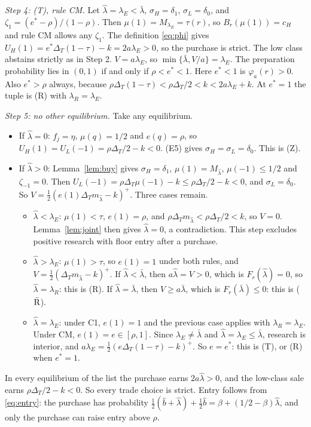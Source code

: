 \documentclass[12pt]{article}
\theoremstyle{definition}
\theoremstyle{remark}
\newcommand{\DT}{\Delta_T}
\newcommand{\lh}{\hat\lambda}
\newcommand{\lb}{\bar\lambda}
\begin{document}
\emph{Step 4: (T), rule CM.} Let $\lh=\lambda_E<\lb$, $\sigma_H=\delta_1$, $\sigma_L=\delta_0$, and
$\zeta_1=(e^*-\rho)/(1-\rho)$. Then $\mu(1)=M_{\lambda_E}=\tau(r)$, so $B_r(\mu(1))=c_H$ and rule CM allows any
$\zeta_1$. The definition \eqref{eq:phi} gives $U_H(1)=e^*\DT(1-\tau)-k=2a\lambda_E>0$, so the purchase is strict.
The low class abstains strictly as in Step 2. $V=a\lambda_E$, so $\min\{\lb,V/a\}=\lambda_E$. The preparation
probability lies in $(0,1)$ if and only if $\rho<e^*<1$. Here $e^*<1$ is $\varphi_a(r)>0$. Also
$e^*>\rho$ always, because $\rho\DT(1-\tau)<\rho\DT/2<k<2a\lambda_E+k$. At $e^*=1$ the tuple is (R) with
$\lambda_R=\lambda_E$.

\emph{Step 5: no other equilibrium.} Take any equilibrium.
\begin{itemize}[nosep]
\item If $\lh=0$: $f_j=\eta$, $\mu(q)=1/2$ and $e(q)=\rho$, so $U_H(1)=U_L(-1)=\rho\DT/2-k<0$. (E5) gives
  $\sigma_H=\sigma_L=\delta_0$. This is (Z).
\item If $\lh>0$: Lemma~\ref{lem:buy} gives $\sigma_H=\delta_1$, $\mu(1)=M_{\lh}$, $\mu(-1)\le1/2$ and $\zeta_{-1}=0$.
  Then $U_L(-1)=\rho\DT\mu(-1)-k\le\rho\DT/2-k<0$, and $\sigma_L=\delta_0$. So $V=\frac12(e(1)\DT m_{\lh}-k)^+$. Three
  cases remain.
  \begin{itemize}[nosep]
  \item $\lh<\lambda_E$: $\mu(1)<\tau$, $e(1)=\rho$, and $\rho\DT m_{\lh}<\rho\DT/2<k$, so $V=0$. Lemma~\ref{lem:joint} then
    gives $\lh=0$, a contradiction. This step excludes positive research with floor entry after a purchase.
  \item $\lh>\lambda_E$: $\mu(1)>\tau$, so $e(1)=1$ under both rules, and $V=\frac12(\DT m_{\lh}-k)^+$. If $\lh<\lb$, then
    $a\lh=V>0$, which is $F_r(\lh)=0$, so $\lh=\lambda_R$: this is (R). If $\lh=\lb$, then $V\ge a\lb$, which is
    $F_r(\lb)\le0$: this is ($\bar{\rm R}$).
  \item $\lh=\lambda_E$: under C1, $e(1)=1$ and the previous case applies with $\lambda_R=\lambda_E$. Under CM,
    $e(1)=e\in[\rho,1]$. Since $\lambda_E\ne\lb$ and $\lh=\lambda_E\le\lb$, research is interior, and
    $a\lambda_E=\frac12(e\DT(1-\tau)-k)^+$. So $e=e^*$: this is (T), or (R) when $e^*=1$.
  \end{itemize}
\end{itemize}
In every equilibrium of the list the purchase earns $2a\lh>0$, and the low-class sale earns $\rho\DT/2-k<0$. So
every trade choice is strict. Entry follows from \eqref{eq:entry}: the purchase has probability
$\frac12(\hat b+\lh)+\frac12\hat b=\beta+(1/2-\beta)\lh$, and only the purchase can raise entry above $\rho$.
\end{document}
